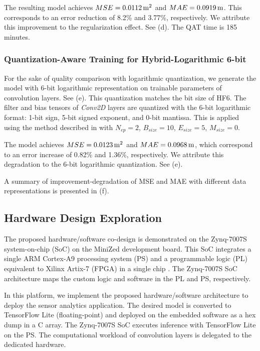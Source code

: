 The resulting model achieves $MSE=\unit[0.0112]{m^2}$ and $MAE=\unit[0.0919]{m}$. This corresponds to an error reduction of 8.2\% and 3.77\%, respectively. We attribute this improvement to the regularization effect. See (d). The QAT time is 185 minutes.


\subsubsection{Quantization-Aware Training for Hybrid-Logarithmic 6-bit}
For the sake of quality comparison with logarithmic quantization, we generate the model with 6-bit logarithmic representation on trainable parameters of convolution layers. See (e). This quantization matches the bit size of HF6. The filter and bias tensors of \emph{Conv2D} layers are quantized with the 6-bit logarithmic format: 1-bit sign, 5-bit signed exponent, and 0-bit mantissa. This is applied using the method described in  with $N_{ep}=2$, $B_{size}=10$, $E_{size}=5$, $M_{size}=0$.

The model achieves $MSE=\unit[0.0123]{m^2}$ and $MAE=\unit[0.0968]{m}$, which correspond to an error increase of 0.82\% and 1.36\%, respectively. We attribute this degradation to the 6-bit logarithmic quantization. See (e).

A summary of improvement-degradation of MSE and MAE with different data representations is presented in (f).

\subsection{Hardware Design Exploration}
The proposed hardware/software co-design is demonstrated on the Zynq-7007S system-on-chip (SoC) on the MiniZed development board. This SoC integrates a single ARM Cortex-A9 processing system (PS) and a programmable logic (PL) equivalent to Xilinx Artix-7 (FPGA) in a single chip \cite{xilinx2015zynq}. The Zynq-7007S SoC architecture maps the custom logic and software in the PL and PS, respectively.

In this platform, we implement the proposed hardware/software architecture to deploy the sensor analytics application. The desired model is converted to TensorFlow Lite (floating-point) and deployed on the embedded software as a hex dump in a C array. The Zynq-7007S SoC executes inference with TensorFlow Lite on the PS. The computational workload of convolution layers is delegated to the dedicated hardware.

